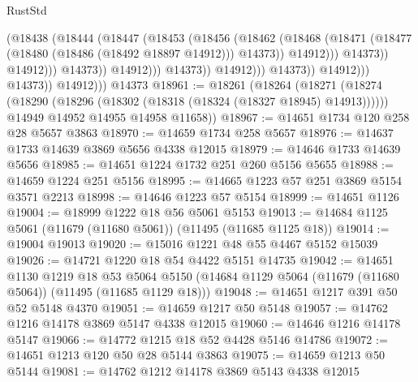 \begin{lexlean}{RustStd}
\begin{coremodule}
                                              (@18438
                                                (@18444
                                                  (@18447
                                                    (@18453
                                                      (@18456
                                                        (@18462
                                                          (@18468
                                                            (@18471
                                                              (@18477
                                                                (@18480
                                                                  (@18486 (@18492 @18897 @14912)))
                                                                @14373))
                                                            @14912)))
                                                      @14373))
                                                  @14912)))
                                            @14373))
                                        @14912)))
                                  @14373))
                              @14912)))
                        @14373))
                    @14912)))
              @14373))
          @14912)))
    @14373
@18961 := @18261
    (@18264
      (@18271
        (@18274 (@18290 (@18296 (@18302 (@18318 (@18324 (@18327 @18945) @14913))))))
        @14949
        @14952
        @14955
        @14958
        @11658))
@18967 := @14651 @1734 @120 @258 @28 @5657 @3863
@18970 := @14659 @1734 @258 @5657
@18976 := @14637 @1733 @14639 @3869 @5656 @4338 @12015
@18979 := @14646 @1733 @14639 @5656
@18985 := @14651 @1224 @1732 @251 @260 @5156 @5655
@18988 := @14659 @1224 @251 @5156
@18995 := @14665 @1223 @57 @251 @3869 @5154 @3571 @2213
@18998 := @14646 @1223 @57 @5154
@18999 := @14651 @1126
@19004 := @18999 @1222 @18 @56 @5061 @5153
@19013 := @14684 @1125 @5061 (@11679 (@11680 @5061)) (@11495 (@11685 @1125 @18))
@19014 := @19004 @19013
@19020 := @15016 @1221 @48 @55 @4467 @5152 @15039
@19026 := @14721 @1220 @18 @54 @4422 @5151 @14735
@19042 := @14651
    @1130
    @1219
    @18
    @53
    @5064
    @5150
    (@14684 @1129 @5064 (@11679 (@11680 @5064)) (@11495 (@11685 @1129 @18)))
@19048 := @14651 @1217 @391 @50 @52 @5148 @4370
@19051 := @14659 @1217 @50 @5148
@19057 := @14762 @1216 @14178 @3869 @5147 @4338 @12015
@19060 := @14646 @1216 @14178 @5147
@19066 := @14772 @1215 @18 @52 @4428 @5146 @14786
@19072 := @14651 @1213 @120 @50 @28 @5144 @3863
@19075 := @14659 @1213 @50 @5144
@19081 := @14762 @1212 @14178 @3869 @5143 @4338 @12015

\end{coremodule}
\end{lexlean}
